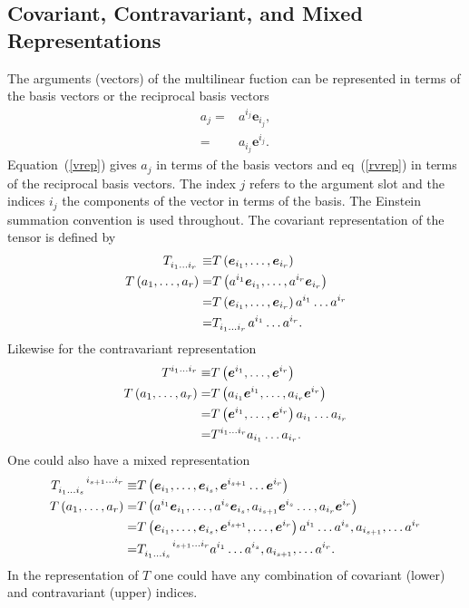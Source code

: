 \documentclass[12pt,twoside,openright]{memoir}
\newcommand{\bm}[1]{\boldsymbol{#1}}
\newcommand{\lp}{\left (}
\newcommand{\rp}{\right )}
\newcommand{\f}[2]{{#1}\lp {#2} \rp}
\newcommand{\eb}{\bm{e}}
\begin{document}
\subsection{Covariant, Contravariant, and Mixed Representations}

The arguments (vectors) of the multilinear fuction can be represented in terms of the basis vectors or the reciprocal basis vectors
\begin{align}
	a_{j} =& a^{i_{j}}\eb_{i_{j}}, \label{vrep}\\
	      =& a_{i_{j}}\eb^{i_{j}}. \label{rvrep}
\end{align}
Equation~(\ref{vrep}) gives $a_{j}$ in terms of the basis vectors and eq~(\ref{rvrep}) in terms of the reciprocal basis vectors. The index
$j$ refers to the argument slot and the indices $i_{j}$ the components of the vector in terms of the basis.  The Einstein summation
convention is used throughout.  The covariant representation of the tensor is defined by
\begin{align}
	T\indices{_{i_{1}\dots i_{r}}} \equiv& \f{T}{\eb_{i_{1}},\dots,\eb_{i_{r}}} \\
	\f{T}{a_{1},\dots,a_{r}} =& \f{T}{a^{i_{1}}\eb_{i_{1}},\dots,a^{i_{r}}\eb_{i_{r}}} \nonumber \\
	                         =& \f{T}{\eb_{i_{1}},\dots,\eb_{i_{r}}}a^{i_{1}}\dots a^{i_{r}} \nonumber \\
	                         =& T\indices{_{i_{1}\dots i_{r}}}a^{i_{1}}\dots a^{i_{r}}.
\end{align}
Likewise for the contravariant representation
\begin{align}
	T\indices{^{i_{1}\dots i_{r}}} \equiv& \f{T}{\eb^{i_{1}},\dots,\eb^{i_{r}}} \\
	\f{T}{a_{1},\dots,a_{r}} =& \f{T}{a_{i_{1}}\eb^{i_{1}},\dots,a_{i_{r}}\eb^{i_{r}}} \nonumber \\
	                         =& \f{T}{\eb^{i_{1}},\dots,\eb^{i_{r}}}a_{i_{1}}\dots a_{i_{r}} \nonumber \\
	                         =& T\indices{^{i_{1}\dots i_{r}}}a_{i_{1}}\dots a_{i_{r}}.
\end{align}
One could also have a mixed representation
\begin{align}
	T\indices{_{i_{1}\dots i_{s}}^{i_{s+1}\dots i_{r}}} \equiv& \f{T}{\eb_{i_{1}},\dots,\eb_{i_{s}},\eb^{i_{s+1}}\dots\eb^{i_{r}}} \\
	\f{T}{a_{1},\dots,a_{r}} =& \f{T}{a^{i_{1}}\eb_{i_{1}},\dots,a^{i_{s}}\eb_{i_{s}},
	                            a_{i_{s+1}}\eb^{i_{s}}\dots,a_{i_{r}}\eb^{i_{r}}} \nonumber \\
	                         =& \f{T}{\eb_{i_{1}},\dots,\eb_{i_{s}},\eb^{i_{s+1}},\dots,\eb^{i_{r}}}
	                            a^{i_{1}}\dots a^{i_{s}},a_{i_{s+1}},\dots a^{i_{r}} \nonumber \\
	                         =& T\indices{_{i_{1}\dots i_{s}}^{i_{s+1}\dots i_{r}}}a^{i_{1}}\dots a^{i_{s}},a_{i_{s+1}},\dots a^{i_{r}}.
\end{align}
In the representation of $T$ one could have any combination of covariant (lower) and contravariant (upper) indices.
\end{document}
